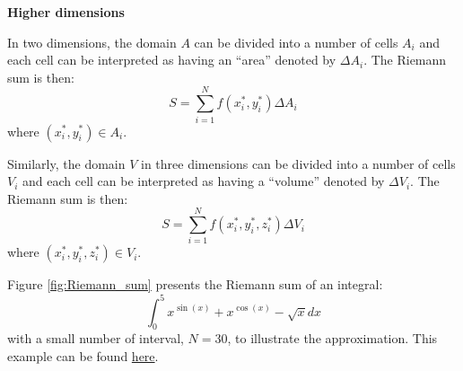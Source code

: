 \textbf{Higher dimensions}

In two dimensions, the domain $A$ can be divided into a number of cells $A_i$ and each cell can be interpreted as having an ``area'' denoted by $\Delta A_i$. The Riemann sum is then:
\begin{equation}
	S = \sum_{i=1}^N f(x_i^*, y_i^*) \Delta A_i
\end{equation}
where $(x_i^*,y_i^*) \in A_i$.

Similarly, the domain $V$ in three dimensions can be divided into a number of cells $V_i$ and each cell can be interpreted as having a ``volume'' denoted by $\Delta V_i$. The Riemann sum is then:
\begin{equation}
	S = \sum_{i=1}^N f(x_i^*, y_i^*, z_i^*) \Delta V_i
\end{equation}
where $(x_i^*,y_i^*,z_i^*) \in V_i$. 

Figure \ref{fig:Riemann_sum} presents the Riemann sum of an integral:
\begin{equation}
	\int_0^5 x^{\sin(x)} + x^{\cos(x)} - \sqrt{x} dx
\end{equation}
with a small number of interval, $N = 30$, to illustrate the approximation. This example can be found \href{https://github.com/chitn/quantfin_study/blob/master/integration.py}{here}.

